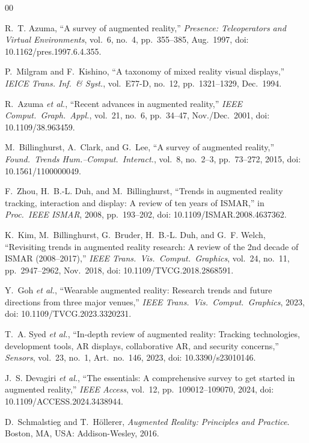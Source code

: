 \documentclass[conference]{IEEEtran}
\begin{document}
\begin{thebibliography}{00}

R.~T. Azuma, ``A survey of augmented reality,'' \emph{Presence: Teleoperators and Virtual Environments}, vol.~6, no.~4, pp.~355--385, Aug.~1997, doi: 10.1162/pres.1997.6.4.355.

P.~Milgram and F.~Kishino, ``A taxonomy of mixed reality visual displays,'' \emph{IEICE Trans. Inf.\ \& Syst.}, vol.~E77-D, no.~12, pp.~1321--1329, Dec.~1994.

R.~Azuma \textit{et al.}, ``Recent advances in augmented reality,'' \emph{IEEE Comput.\ Graph.\ Appl.}, vol.~21, no.~6, pp.~34--47, Nov./Dec.~2001, doi: 10.1109/38.963459.

M.~Billinghurst, A.~Clark, and G.~Lee, ``A survey of augmented reality,'' \emph{Found.\ Trends Hum.--Comput.\ Interact.}, vol.~8, no.~2--3, pp.~73--272, 2015, doi: 10.1561/1100000049.

F.~Zhou, H.~B.-L. Duh, and M.~Billinghurst, ``Trends in augmented reality tracking, interaction and display: A review of ten years of ISMAR,'' in \emph{Proc.\ IEEE ISMAR}, 2008, pp.~193--202, doi: 10.1109/ISMAR.2008.4637362.

K.~Kim, M.~Billinghurst, G.~Bruder, H.~B.-L. Duh, and G.~F. Welch, ``Revisiting trends in augmented reality research: A review of the 2nd decade of ISMAR (2008--2017),'' \emph{IEEE Trans.\ Vis.\ Comput.\ Graphics}, vol.~24, no.~11, pp.~2947--2962, Nov.~2018, doi: 10.1109/TVCG.2018.2868591.

Y.~Goh \textit{et al.}, ``Wearable augmented reality: Research trends and future directions from three major venues,'' \emph{IEEE Trans.\ Vis.\ Comput.\ Graphics}, 2023, doi: 10.1109/TVCG.2023.3320231.

T.~A. Syed \textit{et al.}, ``In-depth review of augmented reality: Tracking technologies, development tools, AR displays, collaborative AR, and security concerns,'' \emph{Sensors}, vol.~23, no.~1, Art.~no.~146, 2023, doi: 10.3390/s23010146.

J.~S. Devagiri \textit{et al.}, ``The essentials: A comprehensive survey to get started in augmented reality,'' \emph{IEEE Access}, vol.~12, pp.~109012--109070, 2024, doi: 10.1109/ACCESS.2024.3438944.

D.~Schmalstieg and T.~H\"ollerer, \emph{Augmented Reality: Principles and Practice}. Boston, MA, USA: Addison-Wesley, 2016.


\end{thebibliography}
\end{document}
